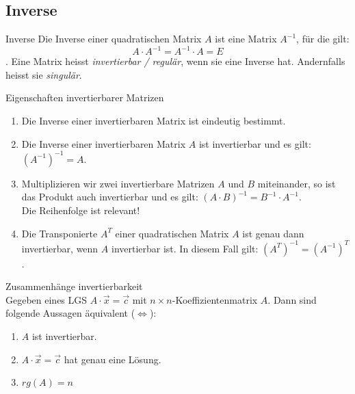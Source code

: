 \subsection{Inverse}
    \begin{definition}{Inverse}
        Die Inverse einer quadratischen Matrix $A$ ist eine Matrix $A^{-1}$, für die gilt:
        \begin{equation*}
            A\cdot A^{-1}=A^{-1}\cdot A=E
        \end{equation*}.
        Eine Matrix heisst \textit{invertierbar / regulär}, wenn sie eine Inverse hat. 
        Andernfalls heisst sie \textit{singulär}.
    \end{definition}
    \begin{theorem}{Eigenschaften invertierbarer Matrizen}
        \begin{enumerate}
            \item Die Inverse einer invertierbaren Matrix ist eindeutig bestimmt.
            \item Die Inverse einer invertierbaren Matrix $A$ ist invertierbar und es gilt: $(A^{-1})^{-1}=A$.
            \item Multiplizieren wir zwei invertierbare Matrizen $A$ und $B$ miteinander, 
                so ist das Produkt auch invertierbar und es gilt: ${(A\cdot B)}^{-1}=B^{-1}\cdot A^{-1}$.\\
                Die Reihenfolge ist relevant!
            \item Die Transponierte $A^T$ einer quadratischen Matrix $A$ ist genau dann invertierbar, 
                wenn $A$ invertierbar ist. In diesem Fall gilt: ${(A^T)^{-1}}={(A^{-1})}^T$.
        \end{enumerate}
    \end{theorem}
    \begin{lemma}{Zusammenhänge invertierbarkeit}\\
        Gegeben eines LGS $A\cdot\vec{x}=\vec{c}$ mit $n\times n$-Koeffizientenmatrix $A$.
        Dann sind folgende Aussagen äquivalent ($\Leftrightarrow$):
        \begin{enumerate}
            \item $A$ ist invertierbar.
            \item $A\cdot\vec{x}=\vec{c}$ hat genau eine Lösung.
            \item $rg(A)=n$
        \end{enumerate}
    \end{lemma}

